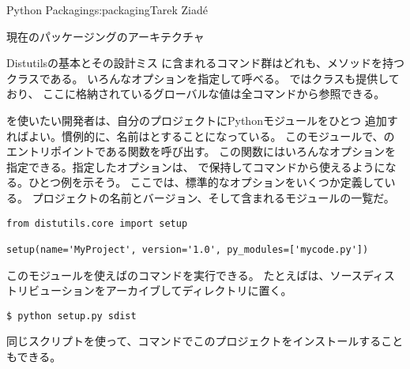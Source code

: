 \begin{aosachapter}{Python Packaging}{s:packaging}{Tarek Ziad\'{e}}
\begin{aosasect1}{現在のパッケージングのアーキテクチャ}
\begin{aosasect2}{Distutilsの基本とその設計ミス}
に含まれるコマンド群はどれも、メソッドを持つクラスである。
いろんなオプションを指定して呼べる。
ではクラスも提供しており、
ここに格納されているグローバルな値は全コマンドから参照できる。

を使いたい開発者は、自分のプロジェクトにPythonモジュールをひとつ
追加すればよい。慣例的に、名前はとすることになっている。
このモジュールで、のエントリポイントである関数を呼び出す。
この関数にはいろんなオプションを指定できる。指定したオプションは、
で保持してコマンドから使えるようになる。ひとつ例を示そう。
ここでは、標準的なオプションをいくつか定義している。
プロジェクトの名前とバージョン、そして含まれるモジュールの一覧だ。

\pagebreak

\begin{verbatim}
from distutils.core import setup

setup(name='MyProject', version='1.0', py_modules=['mycode.py'])
\end{verbatim}

\noindent
このモジュールを使えばのコマンドを実行できる。
たとえばは、ソースディストリビューションをアーカイブしてディレクトリに置く。

\begin{verbatim}
$ python setup.py sdist
\end{verbatim}

\noindent
同じスクリプトを使って、コマンドでこのプロジェクトをインストールすることもできる。


\end{aosasect2}
\end{aosasect1}
\end{aosachapter}
